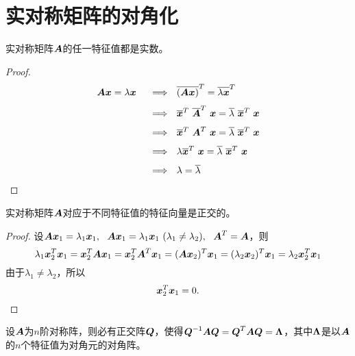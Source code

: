 \section{实对称矩阵的对角化}

\begin{frame}
  
  \begin{li}
    实对称矩阵$\A$的任一特征值都是实数。
  \end{li}
  \begin{proof}
    $$
    \begin{array}{rl}
      \A\xx = \lambda \xx
      &~~\Longrightarrow~~
        \overline{(\A\xx)}^T = \overline{\lambda \xx}^T\\[0.1in]
      &~~\Longrightarrow~~
        \overline{\xx}^T~\overline{\A}^T~\xx = \overline{\lambda} ~\overline{\xx}^T~\xx\\[0.1in]
      &~~\Longrightarrow~~
        \overline{\xx}^T~\A^T~\xx = \overline{\lambda} ~\overline{\xx}^T~\xx\\[0.1in]
      &~~\Longrightarrow~~
        \lambda \overline{\xx}^T~\xx = \overline{\lambda} ~\overline{\xx}^T~\xx\\[0.1in]
      &~~\Longrightarrow~~
        \lambda = \overline \lambda
    \end{array}
    $$

  \end{proof}
  
\end{frame}


\begin{frame}
  
  \begin{li}
    实对称矩阵$\A$对应于不同特征值的特征向量是正交的。
  \end{li}
  \begin{proof}
  设$\A\xx_1=\lambda_1\xx_1,~~\A\xx_1=\lambda_1\xx_1~ (\lambda_1\ne\lambda_2), ~~\A^T=\A$，则
  $$
  \lambda_1\xx_2^T\xx_1=\xx_2^T\A\xx_1=\xx_2^T\A^T\xx_1=(\A\xx_2)^T\xx_1=(\lambda_2\xx_2)^T\xx_1=\lambda_2\xx_2^T\xx_1
  $$\pause
  由于$\lambda_1\ne\lambda_2$，所以
  $$
  \xx_2^T\xx_1=0.
  $$
  \end{proof}
  
\end{frame}


\begin{frame}
  \begin{dingli}
  设$\A$为$n$阶对称阵，则必有正交阵$\QQ$，使得$\QQ^{-1}\A\QQ=\QQ^T\A\QQ=\Lambdabd$，其中$\Lambdabd$是以$\A$的$n$个特征值为对角元的对角阵。
  \end{dingli}
\end{frame}


